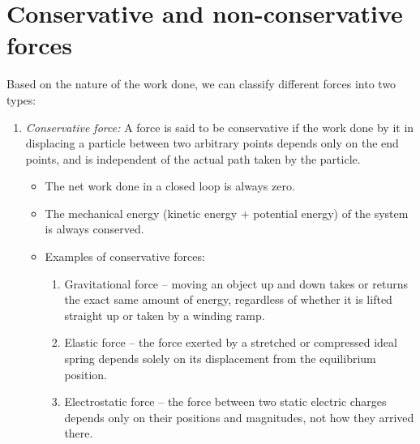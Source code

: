 \section{Conservative and non-conservative forces}
	Based on the nature of the work done, we can classify different forces into two types:
	\begin{enumerate}
		\item \emph{Conservative force:} A force is said to be conservative if the work done by it in displacing a particle between two arbitrary points depends only on the end points, and is independent of the actual path taken by the particle.
		\begin{itemize}
			\item The net work done in a closed loop is always zero.
			\item The mechanical energy (kinetic energy + potential energy) of the system is always conserved.
			\item Examples of conservative forces:
			\begin{enumerate}
				\item Gravitational force -- moving an object up and down takes or returns the exact same amount of energy, regardless of whether it is lifted straight up or taken by a winding ramp.
				\item Elastic force -- the force exerted by a stretched or compressed ideal spring depends solely on its displacement from the equilibrium position.
				\item Electrostatic force -- the force between two static electric charges depends only on their positions and magnitudes, not how they arrived there.
			\end{enumerate}
		\end{itemize}
		

\end{enumerate}
